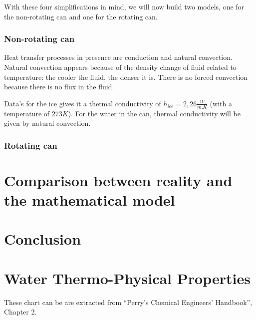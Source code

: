 \documentclass{report}
\begin{document}
	With these four simplifications in mind, we will now build two models, one for the non-rotating can and one for the rotating can.
	
	\subsection{Non-rotating can}\label{nrc}
	
	Heat transfer processes in presence are conduction and natural convection. Natural convection appears because of the density change of fluid related to temperature: the cooler the fluid, the denser it is. There is no forced convection because there is no flux in the fluid.
	
	Data's for the ice gives it a thermal conductivity of $h_{ice}= 2,26 \frac{W}{m.K}$ (with a temperature of $273 K$). For the water in the can, thermal conductivity will be given by natural convection.
	
	
	
	
	\subsection{Rotating can}
	
	\chapter[Reality and mathematical model]{Comparison between reality and the mathematical model}\label{rvmm}
	
	\chapter{Conclusion}\label{ccl}
	
	
	\appendix
	
	\chapter{Water Thermo-Physical Properties}\label{WTPP}
	
	These chart can be are extracted from ``Perry’s	Chemical Engineers’ Handbook'', Chapter 2\cite{properties}.
	
	
	
	{}
	
	
\end{document}
